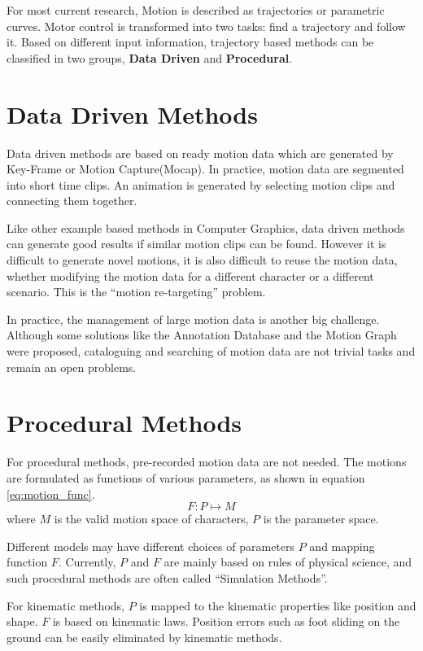 For most current research, 
Motion is described as trajectories or parametric curves. 
Motor control is transformed into two tasks: find a trajectory and follow it. 
Based on different input information, trajectory based methods can be classified in two groups,
\textbf{Data Driven} and \textbf{Procedural}.

\section{Data Driven Methods} 
Data driven methods are based on ready motion data which are generated by Key-Frame or Motion Capture(Mocap). 
In practice, motion data are segmented into short time clips. 
An animation is generated by selecting motion clips and connecting them together\citep{Parent2002}.

Like other example based methods in Computer Graphics, data driven methods can generate good results if similar motion clips can be found. 
However it is difficult to generate novel motions, 
it is also difficult to reuse the motion data, whether modifying the motion data for a different character or a different scenario. 
This is the ``motion re-targeting'' problem.

In practice, the management of large motion data is another big challenge. 
Although some solutions like the Annotation Database \citep{Arikan2003} and the Motion Graph \citep{kovar2008motion} were proposed, cataloguing and searching of motion data are not trivial tasks and remain an open problems.

\section{Procedural Methods}
For procedural methods, pre-recorded motion data are not needed. 
The motions are formulated as functions of various parameters, as shown in equation \ref{eq:motion_func}.
\begin{equation}
\label{eq:motion_func}
F:P \mapsto M
\end{equation}
where $M$ is the valid motion space of characters, $P$ is the parameter space.

Different models may have different choices of parameters $P$ and mapping function $F$. 
Currently, $P$ and $F$ are mainly based on rules of physical science, and such procedural methods are often called ``Simulation Methods''. 

For kinematic methods, $P$ is mapped to the kinematic properties like position and shape.
$F$ is based on kinematic laws.  
Position errors such as foot sliding on the ground can be easily eliminated by kinematic methods. 

